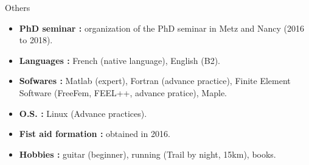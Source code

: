 \documentclass[10pt,a4paper]{report}
\begin{document}
\vspace{0.5cm}
\noindent
{\selectfont
\begin{Large}
Others
\end{Large}
\hrulefill
}
\vspace{.5cm}

\noindent
\begin{itemize}
\item \textbf{PhD seminar :} organization of the PhD seminar in Metz and Nancy (2016 to 2018).
\item \textbf{Languages :} French (native language), English (B2).
\item \textbf{Sofwares :} Matlab (expert), Fortran (advance practice), Finite Element Software (FreeFem, FEEL++, advance pratice), Maple.
\item \textbf{O.S. :} Linux (Advance practices).
\item \textbf{Fist aid formation :} obtained in 2016.
\item \textbf{Hobbies :} guitar (beginner), running (Trail by night, 15km), books.

\end{itemize}
\end{document}
